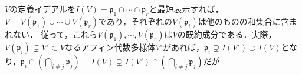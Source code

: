\documentclass{myclass}
\begin{document}
$V$の定義イデアルを$I(V) = \mathfrak{p}_1\cap \cdots \cap \mathfrak{p}_r$と最短表示すれば，
$V = V(\mathfrak{p}_1)\cup \cdots \cup V(\mathfrak{p}_r)$であり，それぞれの$V(\mathfrak{p}_i)$は他のものの和集合に含まれない．
従って，これら$V(\mathfrak{p}_1),\cdots,V(\mathfrak{p}_r)$は$V$の既約成分である．実際，$V(\mathfrak{p}_i)\subsetneq V' \subset V$なるアフィン代数多様体$V'$があれば，$\mathfrak{p}_i \supsetneq I(V') \supset I(V)$となり，$\mathfrak{p}_i \cap (\bigcap_{i\neq j}\mathfrak{p}_j) = I(V) \supsetneq I(V')\cap (\bigcap_{i\neq j}\mathfrak{p}_j)$だが

\backmatter

\printindex



\end{document}
